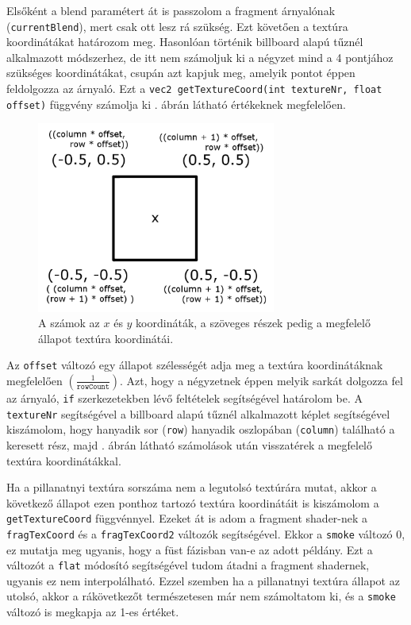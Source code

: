 Elsőként a blend paramétert át is passzolom a fragment árnyalónak (\texttt{currentBlend}), mert csak ott lesz rá szükség. Ezt követően a textúra koordinátákat határozom meg. Hasonlóan történik billboard alapú tűznél alkalmazott módszerhez, de itt nem számoljuk ki a négyzet mind a 4 pontjához szükséges koordinátákat, csupán azt kapjuk meg, amelyik pontot éppen feldolgozza az árnyaló. Ezt a \texttt{vec2 getTextureCoord(int textureNr, float offset)} függvény számolja ki . ábrán látható értékeknek megfelelően.

\begin{figure}[h]
 \centering
 \includegraphics[width=0.7\textwidth]{kepek/particleBillboard.png}
 \caption{A számok az $x$ és $y$ koordináták, a szöveges részek pedig a megfelelő állapot textúra koordinátái.}
 \label{fig:particleBillboard}
\end{figure}

Az \texttt{offset} változó egy állapot szélességét adja meg a textúra koordinátáknak megfelelően $(\frac{1}{\texttt{rowCount}})$. Azt, hogy a négyzetnek éppen melyik sarkát dolgozza fel az árnyaló, \texttt{if} szerkezetekben lévő feltételek segítségével határolom be. A \texttt{textureNr} segítségével a billboard alapú tűznél alkalmazott képlet segítségével kiszámolom, hogy hanyadik sor (\texttt{row}) hanyadik oszlopában (\texttt{column}) található a keresett rész, majd . ábrán látható számolások után visszatérek a megfelelő textúra koordinátákkal.

Ha a pillanatnyi textúra sorszáma nem a legutolsó textúrára mutat, akkor a következő állapot ezen ponthoz tartozó textúra koordinátáit is kiszámolom a \texttt{getTextureCoord} függvénnyel. Ezeket át is adom a fragment shader-nek a \texttt{fragTexCoord} és a \texttt{fragTexCoord2} változók segítségével. Ekkor a \texttt{smoke} változó 0, ez mutatja meg ugyanis, hogy a füst fázisban van-e az adott példány. Ezt a változót a \texttt{flat} módosító segítségével tudom átadni a fragment shadernek, ugyanis ez nem interpolálható. Ezzel szemben ha a pillanatnyi textúra állapot az utolsó, akkor a rákövetkezőt természetesen már nem számoltatom ki, és a \texttt{smoke} változó is megkapja az 1-es értéket.

